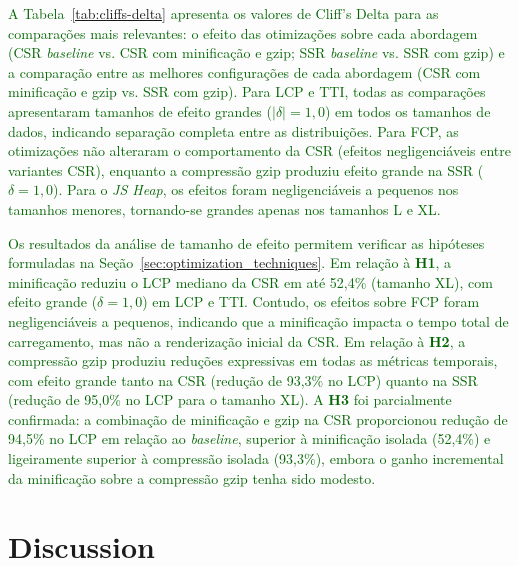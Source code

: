 \documentclass{sbc2019}%
\begin{document}
\textcolor{darkgreen}{A Tabela~\ref{tab:cliffs-delta} apresenta os valores de Cliff's Delta para as comparações mais relevantes: o efeito das otimizações sobre cada abordagem (CSR \textit{baseline} vs. CSR com minificação e gzip; SSR \textit{baseline} vs. SSR com gzip) e a comparação entre as melhores configurações de cada abordagem (CSR com minificação e gzip vs. SSR com gzip). Para LCP e TTI, todas as comparações apresentaram tamanhos de efeito grandes ($|\delta| = 1{,}0$) em todos os tamanhos de dados, indicando separação completa entre as distribuições. Para FCP, as otimizações não alteraram o comportamento da CSR (efeitos negligenciáveis entre variantes CSR), enquanto a compressão gzip produziu efeito grande na SSR ($\delta = 1{,}0$). Para o \textit{JS Heap}, os efeitos foram negligenciáveis a pequenos nos tamanhos menores, tornando-se grandes apenas nos tamanhos L e XL.}



\textcolor{darkgreen}{Os resultados da análise de tamanho de efeito permitem verificar as hipóteses formuladas na Seção~\ref{sec:optimization_techniques}. Em relação à \textbf{H1}, a minificação reduziu o LCP mediano da CSR em até 52{,}4\% (tamanho XL), com efeito grande ($\delta = 1{,}0$) em LCP e TTI. Contudo, os efeitos sobre FCP foram negligenciáveis a pequenos, indicando que a minificação impacta o tempo total de carregamento, mas não a renderização inicial da CSR. Em relação à \textbf{H2}, a compressão gzip produziu reduções expressivas em todas as métricas temporais, com efeito grande tanto na CSR (redução de 93{,}3\% no LCP) quanto na SSR (redução de 95{,}0\% no LCP para o tamanho XL). A \textbf{H3} foi parcialmente confirmada: a combinação de minificação e gzip na CSR proporcionou redução de 94{,}5\% no LCP em relação ao \textit{baseline}, superior à minificação isolada (52{,}4\%) e ligeiramente superior à compressão isolada (93{,}3\%), embora o ganho incremental da minificação sobre a compressão gzip tenha sido modesto.}


\section{Discussion}
\label{sec:discussion}

\end{document}

